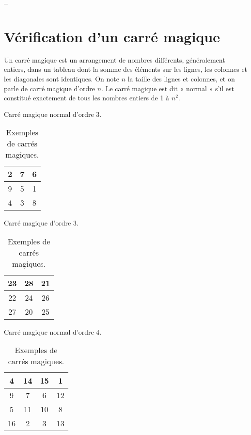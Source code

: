 

\usepackage{subcaption}

  


\begin{center}
{\Large\bf {\type} \no {\num} -- \descrip}
\end{center}

\section{Vérification d'un carré magique}

Un carré magique est un arrangement de nombres différents, généralement entiers, dans un tableau dont la somme des éléments sur les lignes, les colonnes et les diagonales sont identiques. On note $n$ la taille des lignes et colonnes, et on parle de carré magique d'ordre $n$. Le carré magique est dit « normal » s'il est constitué exactement de tous les nombres entiers de 1 à $n^2$.

\begin{table}[!htb]
     \begin{subtable}{.33\linewidth}
      \centering
        \caption{Carré magique normal d'ordre 3.}
	  \begin{tabular}[c]{|c|c|c|}\hline
	  2 & 7 & 6 \\\hline
	  9 & 5 & 1 \\\hline
	  4 & 3 & 8 \\\hline
	  \end{tabular}
    \end{subtable}%
    \begin{subtable}{.33\linewidth}
      \centering
        \caption{Carré magique d'ordre 3.}
	  \begin{tabular}[c]{|c|c|c|}\hline
	  23 & 28 & 21 \\\hline
	  22 & 24 & 26 \\\hline
	  27 & 20 & 25 \\\hline
	  \end{tabular}
    \end{subtable}%
    \begin{subtable}{.33\linewidth}
      \centering
        \caption{Carré magique normal d'ordre 4.}
	  \begin{tabular}[c]{|c|c|c|c|}\hline
	  4 & 14 & 15 &  1 \\\hline
	  9 &  7 &  6 & 12 \\\hline
	  5 & 11 & 10 &  8 \\\hline
	 16 &  2 &  3 & 13 \\\hline	  
	  \end{tabular}
    \end{subtable}
\caption{Exemples de carrés magiques.}
\label{tab:carresmagiques}
\end{table}


